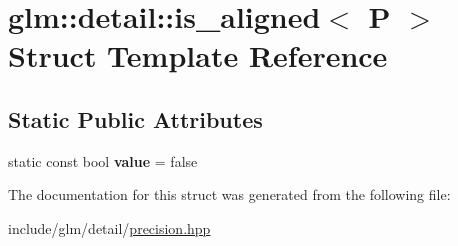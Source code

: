 \hypertarget{structglm_1_1detail_1_1is__aligned}{}\section{glm\+:\+:detail\+:\+:is\+\_\+aligned$<$ P $>$ Struct Template Reference}
\label{structglm_1_1detail_1_1is__aligned}
\subsection*{Static Public Attributes}
\begin{DoxyCompactItemize}
\item 
\mbox{\label{structglm_1_1detail_1_1is__aligned_ac46592cb8bac0221314181e0143aa265}} 
static const bool {\bfseries value} = false
\end{DoxyCompactItemize}


The documentation for this struct was generated from the following file\+:\begin{DoxyCompactItemize}
\item 
include/glm/detail/\hyperlink{precision_8hpp}{precision.\+hpp}\end{DoxyCompactItemize}
